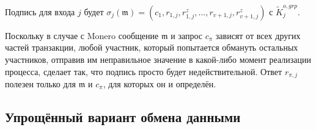Подпись для входа $j$ будет $\sigma_j(\mathfrak{m}) = (c_1,r_{1,j},r^{z}_{1,j},...,r_{v+1,j},r^{z}_{v+1,j})$ с $\tilde{K}^{o,grp}_j$.

Поскольку в случае с Monero сообщение $\mathfrak{m}$ и запрос $c_{\pi}$ зависят от всех других частей транзак\-ции, любой участник, который попытается обмануть остальных участников, отправив им неправильное значение в какой-либо момент реализации процесса, сделает так, что подпись просто будет недействительной. Ответ $r_{\pi,j}$ полезен только для $\mathfrak{m}$ и $c_{\pi}$, для которых он и определён.


\subsection{Упрощённый вариант обмена данными}
\label{sec:simplified-communication}

